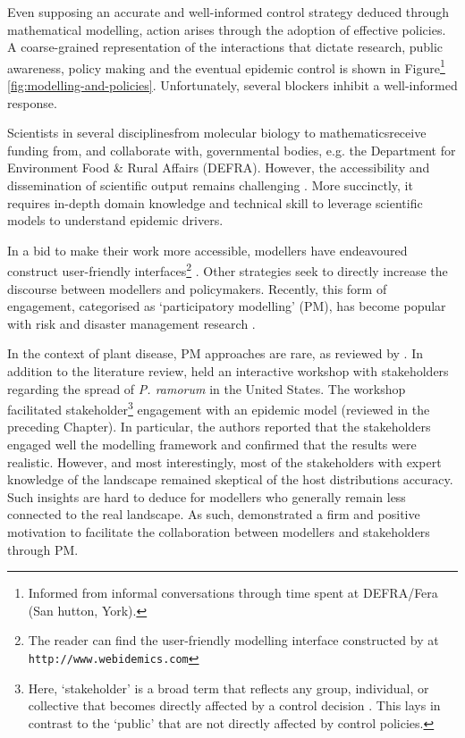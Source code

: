 Even supposing an accurate and well-informed control strategy deduced through mathematical modelling,
action arises through the adoption of effective policies. A coarse-grained representation
of the interactions that dictate research, public awareness, policy making and the eventual epidemic control
is shown in Figure\footnote{Informed from informal conversations through time spent at DEFRA/Fera (San hutton, York).} \ref{fig:modelling-and-policies}.
Unfortunately, several blockers inhibit a well-informed response.

Scientists in several disciplines\textemdash from molecular biology to mathematics\textemdash receive funding from, and collaborate with, governmental bodies, 
e.g. the Department for Environment Food \& Rural Affairs (DEFRA). However, the accessibility and dissemination of scientific output 
remains challenging \cite{jones2020modelling}. More succinctly, it requires in-depth domain knowledge and technical skill to leverage 
scientific models to understand epidemic drivers.

In a bid to make their work more accessible, modellers have endeavoured construct user-friendly interfaces\footnote{
The reader can find the user-friendly modelling interface constructed by \cite{WEBIDEMICS} at \nolinkurl{http://www.webidemics.com}} \cite{WEBIDEMICS}.
Other strategies seek to directly increase the discourse between modellers and policymakers.
Recently, this form of engagement, categorised as `participatory modelling' (PM), 
has become popular with risk and disaster management research \cite{hamalainen2020leadership, ravera2020participatory, hedelin2017participatory}.

In the context of plant disease, PM approaches are rare, as reviewed by \cite{gaydos2019forecasting}. In addition to 
the literature review, \cite{gaydos2019forecasting} held an interactive workshop with stakeholders regarding the 
spread of \textit{P. ramorum } in the United States. The workshop facilitated stakeholder\footnote{Here, `stakeholder' is a broad term that reflects any 
group, individual, or collective that becomes directly affected by a control decision \cite{reed2018theory}. This lays in contrast to the `public' 
that are not directly affected by control policies.} engagement with an epidemic model \cite{tonini2017tangible} (reviewed in the preceding Chapter).
In particular, the authors reported that the stakeholders engaged well the modelling framework and
confirmed that the results were realistic. However, and most interestingly, most of the stakeholders with expert knowledge of the landscape remained skeptical of
the host distributions accuracy. Such insights are hard to deduce for modellers who generally remain less connected to the real landscape. 
As such, \cite{tonini2017tangible} demonstrated a firm and positive motivation to facilitate the collaboration between modellers and stakeholders through PM.

